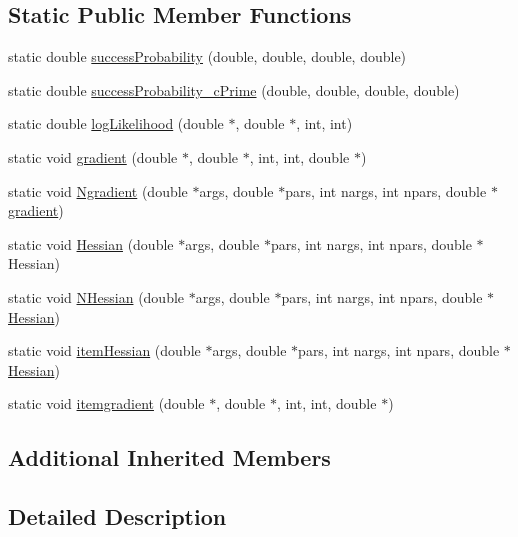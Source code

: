 \subsection*{Static Public Member Functions}
\begin{DoxyCompactItemize}
\item 
static double \hyperlink{classThreePLModel_a4ac3badc7d7a17b57be43d24bfb924e3}{success\+Probability} (double, double, double, double)
\item 
static double \hyperlink{classThreePLModel_a89d3c2a8f9d077e48db38f78aa8d3526}{success\+Probability\+\_\+c\+Prime} (double, double, double, double)
\item 
static double \hyperlink{classThreePLModel_ae31380f753f4bc118788f9dbc93fe4af}{log\+Likelihood} (double $\ast$, double $\ast$, int, int)
\item 
static void \hyperlink{classThreePLModel_a6b86ab6fe2c11047723864ab95bd29da}{gradient} (double $\ast$, double $\ast$, int, int, double $\ast$)
\item 
static void \hyperlink{classThreePLModel_ae24fa3d2b9bf02b79a010ea760f1bff4}{Ngradient} (double $\ast$args, double $\ast$pars, int nargs, int npars, double $\ast$\hyperlink{classThreePLModel_a6b86ab6fe2c11047723864ab95bd29da}{gradient})
\item 
static void \hyperlink{classThreePLModel_a034561892349c03922d857a67d15f79d}{Hessian} (double $\ast$args, double $\ast$pars, int nargs, int npars, double $\ast$Hessian)
\item 
static void \hyperlink{classThreePLModel_acc5f243d6863cf431df88b4b1648e52d}{N\+Hessian} (double $\ast$args, double $\ast$pars, int nargs, int npars, double $\ast$\hyperlink{classThreePLModel_a034561892349c03922d857a67d15f79d}{Hessian})
\item 
static void \hyperlink{classThreePLModel_a4eb5d27957e207af988cfc87b1adbb27}{item\+Hessian} (double $\ast$args, double $\ast$pars, int nargs, int npars, double $\ast$\hyperlink{classThreePLModel_a034561892349c03922d857a67d15f79d}{Hessian})
\item 
static void \hyperlink{classThreePLModel_a1e103a8afde4c931b15d451f131ebc6e}{itemgradient} (double $\ast$, double $\ast$, int, int, double $\ast$)
\end{DoxyCompactItemize}
\subsection*{Additional Inherited Members}


\subsection{Detailed Description}


